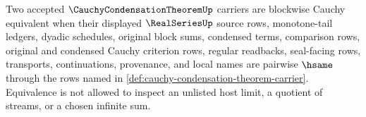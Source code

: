 
\begin{definition}
\label{def:cauchy-condensation-theorem-blockwise-classifier}
Two accepted $\CauchyCondensationTheoremUp$ carriers are blockwise Cauchy equivalent when their displayed $\RealSeriesUp$ source rows, monotone-tail ledgers, dyadic schedules, original block sums, condensed terms, comparison rows, original and condensed Cauchy criterion rows, regular readbacks, seal-facing rows, transports, continuations, provenance, and local names are pairwise $\hsame$ through the rows named in \autoref{def:cauchy-condensation-theorem-carrier}. Equivalence is not allowed to inspect an unlisted host limit, a quotient of streams, or a chosen infinite sum.
\end{definition}

